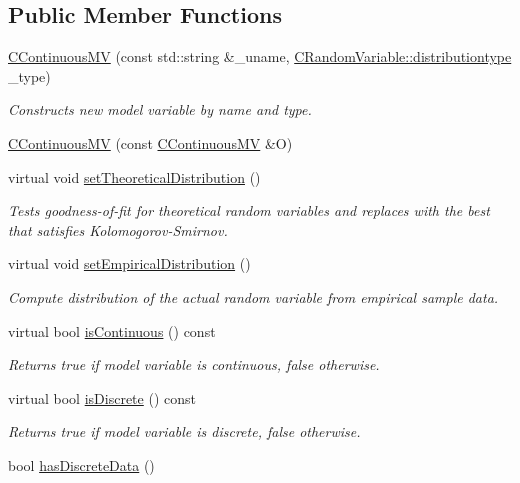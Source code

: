 \subsection*{Public Member Functions}
\begin{DoxyCompactItemize}
\item 
\hyperlink{class_go_s_u_m_1_1_c_continuous_m_v_a2ae3981f3aa32aea3c1d3224c31f4643}{C\-Continuous\-M\-V} (const std\-::string \&\-\_\-uname, \hyperlink{class_c_random_variable_a80d2a87c43847274138b51f7d713d7f1}{C\-Random\-Variable\-::distributiontype} \-\_\-type)
\begin{DoxyCompactList}\small\item\em Constructs new model variable by name and type. \end{DoxyCompactList}\item 
\hyperlink{class_go_s_u_m_1_1_c_continuous_m_v_a6934633087f0189586c9c5b7cb5f86f7}{C\-Continuous\-M\-V} (const \hyperlink{class_go_s_u_m_1_1_c_continuous_m_v}{C\-Continuous\-M\-V} \&O)
\item 
virtual void \hyperlink{class_go_s_u_m_1_1_c_continuous_m_v_a923c07b0735783d016b4e155b5eb0539}{set\-Theoretical\-Distribution} ()
\begin{DoxyCompactList}\small\item\em Tests goodness-\/of-\/fit for theoretical random variables and replaces with the best that satisfies Kolomogorov-\/\-Smirnov. \end{DoxyCompactList}\item 
virtual void \hyperlink{class_go_s_u_m_1_1_c_continuous_m_v_a65b0b9b16980f16fe2bc36bf8d79e3b9}{set\-Empirical\-Distribution} ()
\begin{DoxyCompactList}\small\item\em Compute distribution of the actual random variable from empirical sample data. \end{DoxyCompactList}\item 
virtual bool \hyperlink{class_go_s_u_m_1_1_c_continuous_m_v_a8f523f36ccdecfb58d468b6976890b15}{is\-Continuous} () const 
\begin{DoxyCompactList}\small\item\em Returns true if model variable is continuous, false otherwise. \end{DoxyCompactList}\item 
virtual bool \hyperlink{class_go_s_u_m_1_1_c_continuous_m_v_aeaef5939c27a7e074c33f783d73484a5}{is\-Discrete} () const 
\begin{DoxyCompactList}\small\item\em Returns true if model variable is discrete, false otherwise. \end{DoxyCompactList}\item 
bool \hyperlink{class_go_s_u_m_1_1_c_continuous_m_v_a58012df86509e7f8ee5b23c5e44b8465}{has\-Discrete\-Data} ()
\end{DoxyCompactItemize}
